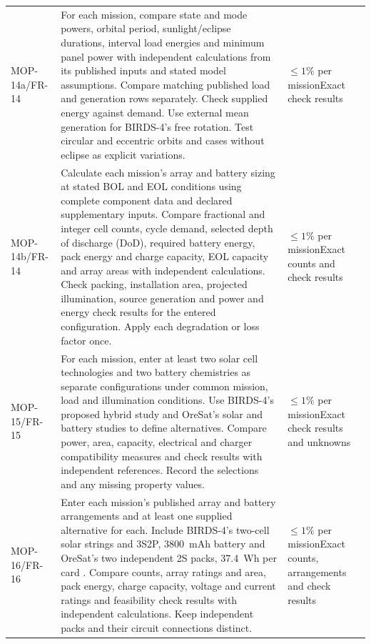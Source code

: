 \begin{longtable}{@{}P{0.20\ReportTableBodyWidth}P{0.60\ReportTableBodyWidth}P{0.20\ReportTableBodyWidth}@{}}
MOP-14a/FR-14 & For each mission, compare state and mode powers, orbital period, sunlight/eclipse durations, interval load energies and minimum panel power with independent calculations from its published inputs and stated model assumptions. Compare matching published load and generation rows separately. Check supplied energy against demand. Use external mean generation for BIRDS-4's free rotation. Test circular and eccentric orbits and cases without eclipse as explicit variations. & $\leq 1\%$ per mission\newline Exact check results \\
MOP-14b/FR-14 & Calculate each mission's array and battery sizing at stated BOL and EOL conditions using complete component data and declared supplementary inputs. Compare fractional and integer cell counts, cycle demand, selected depth of discharge (DoD), required battery energy, pack energy and charge capacity, EOL capacity and array areas with independent calculations. Check packing, installation area, projected illumination, source generation and power and energy check results for the entered configuration. Apply each degradation or loss factor once. & $\leq 1\%$ per mission\newline Exact counts and check results \\
MOP-15/FR-15 & For each mission, enter at least two solar cell technologies and two battery chemistries as separate configurations under common mission, load and illumination conditions. Use BIRDS-4's proposed hybrid study \citep[Sec.~III]{shrestha2026solarreliability} and OreSat's solar and battery studies \citep{oresat2025solardesign,oresatbatteryresearch} to define alternatives. Compare power, area, capacity, electrical and charger compatibility measures and check results with independent references. Record the selections and any missing property values. & $\leq 1\%$ per mission\newline Exact check results and unknowns \\
MOP-16/FR-16 & Enter each mission's published array and battery arrangements and at least one supplied alternative for each. Include BIRDS-4's two-cell solar strings and 3S2P, 3800~mAh battery \citep[Sec.~2.2, Table~5]{shrestha2021birdssafety} and OreSat's two independent 2S packs, 37.4~Wh per card \citep[p.~6]{greenberg2021oresat}. Compare counts, array ratings and area, pack energy, charge capacity, voltage and current ratings and feasibility check results with independent calculations. Keep independent packs and their circuit connections distinct. & $\leq 1\%$ per mission\newline Exact counts, arrangements and check results \\

\end{longtable}
